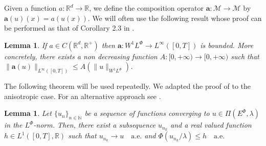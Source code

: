 \documentclass[twoside]{article}
\newtheorem{lem}[thm]{Lemma}
\theoremstyle{remark}
\newcommand{\lphi}{L^{\Phi}}
\newcommand{\ephi}{E^{\Phi}}
\newcommand{\wphi}{W^{1}\lphi}
\renewcommand{\b}[1]{\boldsymbol{#1}}
\newcommand{\rr}{\mathbb{R}}
\renewcommand{\leq}{\leqslant}
\begin{document}
Given a function $a:\mathbb{R}^d\to \mathbb{R}$, we define the composition operator $\b{a}:\mathcal{M}\to \mathcal{M}$ by $\b{a}(u)(x)= a(u(x))$.
We will often use the following result whose proof can be performed as that of  Corollary 2.3 in \cite{ABGMS2015}.
\begin{lem}\label{lem:cota-a}
\label{a_bound} If $a\in C(\mathbb{R}^d,\mathbb{R}^+)$ then $\b{a}:\wphi\to L^{\infty}([0,T])$ is bounded.
More concretely,  there exists a non decreasing function $A:[0,+\infty)\to[0,+\infty)$ such that
 $\|\b{a}(u)\|_{L^{\infty}([0,T])}\leq A(\|u\|_{\wphi})$.
\end{lem}

The following theorem will be used repeatedly. We adapted the proof of 
\cite[Lemma 2.5]{ABGMS2015} to the anisotropic case.    For an alternative approach see \cite{chamra2017anisotropic}.  







\begin{lem}\label{segundo lema}
Let  $\{{u}_n\}_{n\in \mathbb{N}}$ be a sequence of  functions  converging to  ${u}\in \Pi(\ephi,\lambda)$  in the $\lphi$-norm. Then, there exist a subsequence
${u}_{n_k}$ and a real valued function $h\in L^1([0,T],\rr)$ such that ${u}_{n_k}\rightarrow {u} \quad\text{a.e.}$ and $\Phi({u}_{n_k}/\lambda)\leq h\quad\text{a.e.}$
\end{lem}
\end{document}
